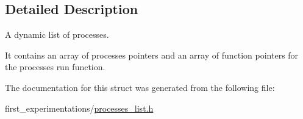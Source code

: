 \subsection{Detailed Description}
A dynamic list of processes. 

It contains an array of processes pointers and an array of function pointers for the processes run function. 

The documentation for this struct was generated from the following file\-:\begin{DoxyCompactItemize}
\item 
first\-\_\-experimentations/\hyperlink{processes__list_8h}{processes\-\_\-list.\-h}\end{DoxyCompactItemize}
